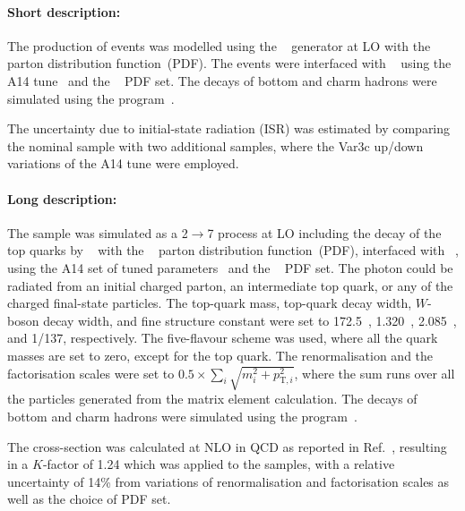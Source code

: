 \paragraph{Short description:}

The production of \ttgamma events was modelled using the \MGNLO[2.3.3]~\cite{Alwall:2014hca}
generator at LO with the \NNPDF[2.3lo]~\cite{Ball:2014uwa} parton distribution function~(PDF).
The events were interfaced with \PYTHIA[8.212]~\cite{Sjostrand:2014zea} using the A14 tune~\cite{ATL-PHYS-PUB-2014-021} and the
\NNPDF[2.3lo]~\cite{Ball:2014uwa} PDF set.
The decays of bottom and charm hadrons were simulated using the \EVTGEN[1.6.0] program~\cite{Lange:2001uf}.

The uncertainty due to initial-state radiation (ISR) was estimated by
comparing the nominal \ttgamma sample with two additional samples,
where the Var3c up/down variations of the A14 tune were employed.

\paragraph{Long description:}

The \ttgamma sample was simulated as a 2$\to$7 process at LO including the decay of the top quarks by
\MGNLO[2.3.3]~\cite{Alwall:2014hca} with the \NNPDF[2.3lo]~\cite{Ball:2014uwa} parton distribution function~(PDF), interfaced with
\PYTHIA[8.212]~\cite{Sjostrand:2014zea}, using the A14 set of tuned parameters~\cite{ATL-PHYS-PUB-2014-021} and the
\NNPDF[2.3lo]~\cite{Ball:2014uwa} PDF set. The photon could be radiated from an initial charged parton, an intermediate top quark, 
or any of the charged final-state particles. The top-quark mass, top-quark decay width, $W$-boson decay width, 
and fine structure constant were set to 172.5~\GeV, 1.320~\GeV, 2.085~\GeV, and 1/137, respectively.
The five-flavour scheme was used, where all the quark masses are set to zero, except for the top quark. The renormalisation and the
factorisation scales were set to $0.5\times \sum_i \sqrt{m^2_i+p^2_{\text{T},i}}$, where the sum runs over all the particles generated 
from the matrix element calculation.
The decays of bottom and charm hadrons were simulated using the \EVTGEN[1.6.0] program~\cite{Lange:2001uf}.

The cross-section was calculated at NLO in QCD as reported in Ref.~\cite{Melnikov:2011ta}, resulting in a $K$-factor of 1.24 which was applied 
to the samples, with a relative uncertainty of 14\% from variations of renormalisation and factorisation scales as well 
as the choice of PDF set.

